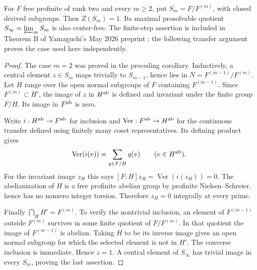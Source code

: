 \begin{lemma}
\label{A:solvable-centers}
For $F$ free profinite of rank two and every $m\ge2$, put
$S_m=F/F^{(m)}$, with closed derived subgroups. Then
$Z(S_m)=1$. Its maximal prosolvable quotient
$S_\infty=\varprojlim_m S_m$ is also center-free.
The finite-step assertion is included in Theorem B of
Yamaguchi's May 2026 preprint \cite{A_Yamaguchi2026Centers};
the following transfer argument proves the case used here
independently.
\end{lemma}
\begin{proof}
The case $m=2$ was proved in the preceding corollary.
Inductively, a central element $z\in S_m$ maps trivially
to $S_{m-1}$, hence lies in
$N=F^{(m-1)}/F^{(m)}$. Let $H$ range over the open normal
subgroups of $F$ containing $F^{(m-1)}$. Since
$F^{(m)}\subset H'$, the image of $z$ in $H^{\rm ab}$
is defined and invariant under the finite group $F/H$.
Its image in $F^{\rm ab}$ is zero.

Write $i:H^{\rm ab}\to F^{\rm ab}$ for inclusion and
$\operatorname{Ver}:F^{\rm ab}\to H^{\rm ab}$ for the
continuous transfer defined using finitely many coset
representatives. Its defining product gives
\[
 \operatorname{Ver}(i(v))=\sum_{q\in F/H}q(v)
 \qquad(v\in H^{\rm ab}).
\]
For the invariant image $z_H$ this says
$[F:H]z_H=\operatorname{Ver}(i(z_H))=0$.
The abelianization of $H$ is a free profinite abelian group
by profinite Nielsen--Schreier, hence has no nonzero
integer torsion. Therefore $z_H=0$ integrally at every
prime.

Finally
$\bigcap_H H'=F^{(m)}$. To verify the nontrivial inclusion,
an element of $F^{(m-1)}$ outside $F^{(m)}$ survives in
some finite quotient of $F/F^{(m)}$. In that quotient the
image of $F^{(m-1)}$ is abelian. Taking $H$ to be its
inverse image gives an open normal subgroup for which the
selected element is not in $H'$. The converse inclusion
is immediate. Hence $z=1$. A central element of
$S_\infty$ has trivial image in every $S_m$, proving the
last assertion.
\end{proof}

